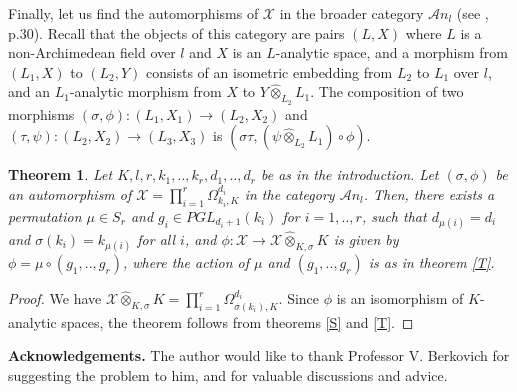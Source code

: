 \documentclass{amsart}
\theoremstyle{theorem}
\newtheorem{theorem}{Theorem}
\theoremstyle{lemma}
\theoremstyle{prop}
\theoremstyle{definition}
\theoremstyle{corollary}
\theoremstyle{remark}
\newcommand{\X}{\mathcal{X}}
\begin{document}
Finally, let us find the automorphisms of $\X$ in the broader category ${\mathcal An}_l$ (see \cite{ber4}, p.30). Recall that the objects of this category are pairs $(L,X)$ where $L$ is a non-Archimedean field over $l$ and $X$ is an $L$-analytic space, and a morphism from $(L_1,X)$ to $(L_2,Y)$ consists of an isometric embedding from $L_2$ to $L_1$ over $l$, and an $L_1$-analytic morphism from $X$ to $Y \hat{\otimes}_{L_2}L_1$. The composition of two morphisms $(\sigma, \phi): (L_1,X_1)\rightarrow (L_2,X_2)$ and $(\tau,\psi): (L_2,X_2)\rightarrow (L_3,X_3)$ is $(\sigma \tau, (\psi \hat{\otimes}_{L_2}L_1) \circ \phi)$. 

\begin{theorem} Let $K,l,r, k_1,..,k_r, d_1,..,d_r$ be as in the introduction. Let $(\sigma, \phi)$ be an automorphism of $\X = \prod_{i=1}^r\Omega_{k_i,K}^{d_i}$ in the category ${\mathcal An}_l$. Then, there exists a permutation $\mu \in S_r$ and $g_i \in PGL_{d_i+1}(k_i)$ for $i=1,..,r$, such that $d_{\mu(i)}=d_i$ and $\sigma(k_i)=k_{\mu(i)}$ for all $i$, and $\phi: \X \rightarrow \X \hat{\otimes}_{K,\sigma}K$ is given by $\phi = \mu \circ (g_1,..,g_r)$, where the action of $\mu$ and $(g_1,..,g_r)$ is as in theorem \ref{T}.\end{theorem}
\begin{proof}We have $\X \hat{\otimes}_{K,\sigma}K = \prod_{i=1}^r\Omega_{\sigma(k_i),K}^{d_i}$. Since $\phi$ is an isomorphism of $K$-analytic spaces, the theorem follows from theorems \ref{S} and \ref{T}. \end{proof}

\textbf{Acknowledgements.} The author would like to thank Professor V. Berkovich for suggesting the problem to him, and for valuable discussions and advice. 

\fussy
\end{document}

